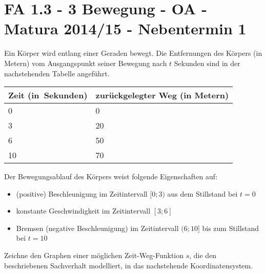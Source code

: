 \section{FA 1.3 - 3 Bewegung - OA - Matura 2014/15 - Nebentermin 1}

\begin{beispiel}[FA 1.3]{1} %
Ein Körper wird entlang einer Geraden bewegt. Die Entfernungen des Körpers (in Metern) vom Ausgangspunkt seiner Bewegung nach $t$ Sekunden sind in der nachstehenden Tabelle angeführt.

\begin{longtable}{|C{3cm}|C{3cm}|} \hline
{} Zeit \mbox{(in Sekunden)} &  zurückgelegter Weg (in Metern) \\  & 0 \\  &20 \\  & 50 \\  & 70 \\ \hline
\end{longtable}
\end{beispiel}

Der Bewegungsablauf des Körpers weist folgende Eigenschaften auf:
\begin{itemize}
	\item (positive) Beschleunigung im Zeitintervall $[0; 3)$ aus dem Stillstand bei $t = 0$
	\item konstante Geschwindigkeit im Zeitintervall $[3; 6]$
	\item Bremsen (negative Beschleunigung) im Zeitintervall $(6; 10]$ bis zum Stillstand bei $t = 10$
\end{itemize}

Zeichne den Graphen einer möglichen Zeit-Weg-Funktion $s$, die den beschriebenen Sachverhalt modelliert, in das nachstehende Koordinatensystem.\leer

